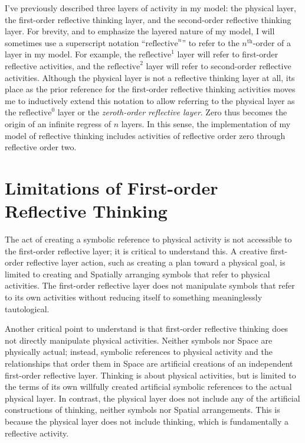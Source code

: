 I've previously described three layers of activity in my model: the
physical layer, the first-order reflective thinking layer, and the
second-order reflective thinking layer.  For brevity, and to emphasize
the layered nature of my model, I will sometimes use a superscript
notation ``$\text{reflective}^n$'' to refer to the $n^\text{th}$-order
of a layer in my model.  For example, the $\text{reflective}^1$ layer
will refer to first-order reflective activities, and the
$\text{reflective}^2$ layer will refer to second-order reflective
activities.  Although the physical layer is not a reflective thinking
layer at all, its place as the prior reference for the first-order
reflective thinking activities moves me to inductively extend this
notation to allow referring to the physical layer as the
$\text{reflective}^0$ layer or the \emph{zeroth-order reflective
  layer}.  Zero thus becomes the origin of an infinite regress of $n$
layers.  In this sense, the implementation of my model of reflective
thinking includes activities of reflective order zero through
reflective order two.

\section{Limitations of First-order Reflective Thinking}

The act of creating a symbolic reference to physical activity is not
accessible to the first-order reflective layer; it is critical to
understand this.  A creative first-order reflective layer action, such
as creating a plan toward a physical goal, is limited to creating and
Spatially arranging symbols that refer to physical activities.  The
first-order reflective layer does not manipulate symbols that refer to
its own activities without reducing itself to something meaninglessly
tautological.

Another critical point to understand is that first-order reflective
thinking does not directly manipulate physical activities.  Neither
symbols nor Space are physically actual; instead, symbolic references
to physical activity and the relationships that order them in Space
are artificial creations of an independent first-order reflective
layer.  Thinking is about physical activities, but is limited to the
terms of its own willfully created artificial symbolic references to
the actual physical layer.  In contrast, the physical layer does not
include any of the artificial constructions of thinking, neither
symbols nor Spatial arrangements.  This is because the physical layer
does not include thinking, which is fundamentally a reflective
activity.

